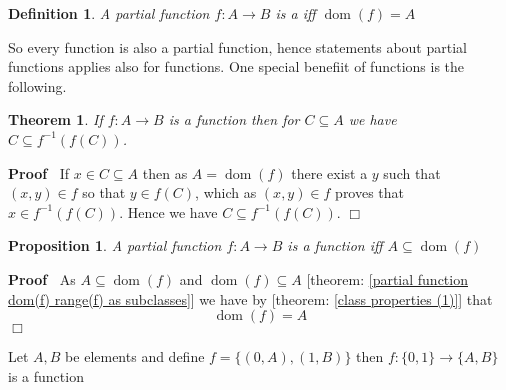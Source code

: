 \documentclass{book}
\newcommand{\tmop}[1]{\ensuremath{\operatorname{#1}}}
\newcommand{\tmtextbf}[1]{\text{{\bfseries{#1}}}}
\newenvironment{proof}{\noindent\textbf{Proof\ }}{\hspace*{\fill}$\Box$\medskip}
\newtheorem{definition}{Definition}
{\theorembodyfont{\rmfamily}\newtheorem{example}{Example}}
\newtheorem{proposition}{Proposition}
{\theorembodyfont{\rmfamily}\newtheorem{remark}{Remark}}
\newtheorem{theorem}{Theorem}
\begin{document}
\begin{definition}
  \label{function}{}A partial function $f : A \rightarrow B$
  is a \tmtextbf{function} iff $\tmop{dom} (f) = A$
\end{definition}

So every function is also a partial function, hence statements about partial
functions applies also for functions. One special benefiit of functions is the
following.

\begin{theorem}
  \label{function preimage of image (1)}If $f : A \rightarrow B$ is a function
  then for $C \subseteq A$ we have $C \subseteq f^{- 1} (f (C))$.
\end{theorem}

\begin{proof}
  If $x \in C \subseteq A$ then as $A = \tmop{dom} (f)$ there exist a $y$ such
  that $(x, y) \in f$ so that $y \in f (C)$, which as $(x, y) \in f$ proves
  that $x \in f^{- 1} (f (C))$. Hence we have $C \subseteq f^{- 1} (f (C))$.
\end{proof}

\begin{proposition}
  \label{function condition (1)}A partial function $f : A \rightarrow B$ is a
  function iff $A \subseteq \tmop{dom} (f)$
\end{proposition}

\begin{proof}
  As $A \subseteq \tmop{dom} (f)$ and $\tmop{dom} (f) \subseteq A$ [theorem:
  \ref{partial function dom(f) range(f) as subclasses}] we have by [theorem:
  \ref{class properties (1)}] that
  \[ \tmop{dom} (f) = A \]
\end{proof}

\begin{example}
  \label{function between {0,1} and {A,B}}Let $A, B$ be elements and define $f
  = \{ (0, A), (1, B) \}$ then $f : \{ 0, 1 \} \rightarrow \{ A, B \}$ is a
  function 
\end{example}
\end{document}
